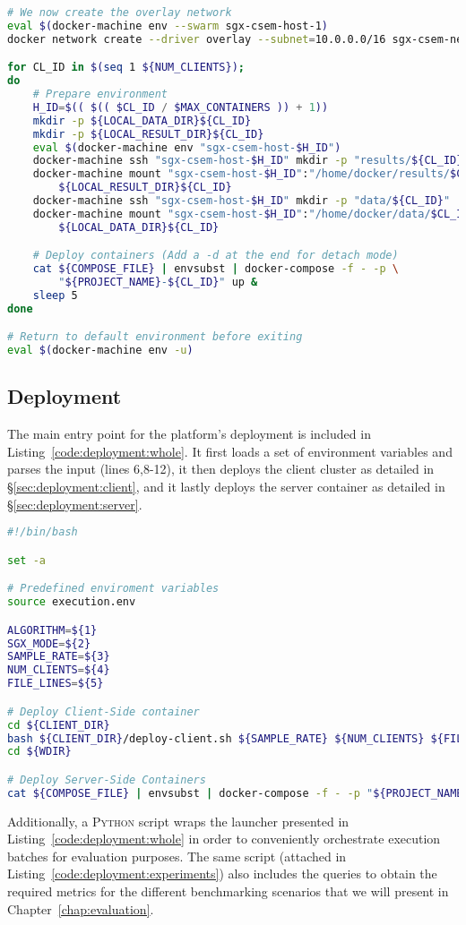 \begin{lstlisting}[language=sh,caption={Client Cluster Deployment Script.},label=code:deploy-client]
# We now create the overlay network
eval $(docker-machine env --swarm sgx-csem-host-1)
docker network create --driver overlay --subnet=10.0.0.0/16 sgx-csem-net

for CL_ID in $(seq 1 ${NUM_CLIENTS});
do
    # Prepare environment
    H_ID=$(( $(( $CL_ID / $MAX_CONTAINERS )) + 1))
    mkdir -p ${LOCAL_DATA_DIR}${CL_ID}
    mkdir -p ${LOCAL_RESULT_DIR}${CL_ID}
    eval $(docker-machine env "sgx-csem-host-$H_ID")
    docker-machine ssh "sgx-csem-host-$H_ID" mkdir -p "results/${CL_ID}"
    docker-machine mount "sgx-csem-host-$H_ID":"/home/docker/results/$CL_ID" \
        ${LOCAL_RESULT_DIR}${CL_ID}
    docker-machine ssh "sgx-csem-host-$H_ID" mkdir -p "data/${CL_ID}"
    docker-machine mount "sgx-csem-host-$H_ID":"/home/docker/data/$CL_ID" \
        ${LOCAL_DATA_DIR}${CL_ID}

    # Deploy containers (Add a -d at the end for detach mode)
    cat ${COMPOSE_FILE} | envsubst | docker-compose -f - -p \
        "${PROJECT_NAME}-${CL_ID}" up &
    sleep 5
done

# Return to default environment before exiting
eval $(docker-machine env -u)
\end{lstlisting}

\subsection{Deployment} \label{sec:deployment:all}

The main entry point for the platform's deployment is included in Listing~\ref{code:deployment:whole}.
It first loads a set of environment variables and parses the input (lines 6,8-12), it then deploys the client cluster as detailed in \S\ref{sec:deployment:client}, and it lastly deploys the server container as detailed in \S\ref{sec:deployment:server}.
\begin{lstlisting}[language=sh,caption={Main entry point for a single execution.},label=code:deployment:whole]
#!/bin/bash

set -a

# Predefined enviroment variables
source execution.env

ALGORITHM=${1}
SGX_MODE=${2}
SAMPLE_RATE=${3}
NUM_CLIENTS=${4}
FILE_LINES=${5}

# Deploy Client-Side container
cd ${CLIENT_DIR}
bash ${CLIENT_DIR}/deploy-client.sh ${SAMPLE_RATE} ${NUM_CLIENTS} ${FILE_LINES}
cd ${WDIR}

# Deploy Server-Side Containers
cat ${COMPOSE_FILE} | envsubst | docker-compose -f - -p "${PROJECT_NAME}" up &
\end{lstlisting}

Additionally, a \textsc{Python} script wraps the launcher presented in Listing~\ref{code:deployment:whole} in order to conveniently orchestrate execution batches for evaluation purposes.
The same script (attached in Listing~\ref{code:deployment:experiments}) also includes the queries to obtain the required metrics for the different benchmarking scenarios that we will present in Chapter~\ref{chap:evaluation}.
